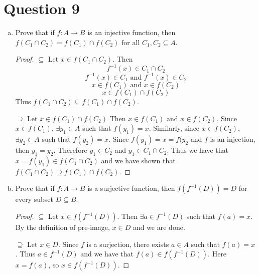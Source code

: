 \documentclass[11pt, oneside]{article}   	%
\begin{document}
\section*{Question 9}
\begin{enumerate}[(a)]
	\item Prove that if $f:A\to B$ is an injective function, then $f(C_1\cap C_2)=f(C_1)\cap f(C_2)$ for all $C_1, C_2\subseteq A$.
	\begin{proof}
		$\subseteq$ Let $x \in f(C_1\cap C_2)$. Then
		$$f^{-1}(x) \in C_1 \cap C_2$$
		$$f^{-1}(x) \in C_1 \text{ and } f^{-1}(x) \in C_2$$
		$$x \in f(C_1) \text{ and } x \in f(C_2)$$
		$$x \in f(C_1) \cap f(C_2)$$
		Thus $f(C_1\cap C_2) \subseteq f(C_1)\cap f(C_2)$.
		
		$\supseteq$ Let $x \in  f(C_1) \cap f(C_2)$ Then $x \in f(C_1)$ and $x \in f(C_2)$. Since $x \in f(C_1)$, $\exists y_1 \in A$ such that $f(y_1)=x$. Similarly, since $x \in f(C_2)$, $\exists y_2 \in A$ such that $f(y_2)=x$. Since $f(y_1) = x = f(y_2$ and $f$ is an injection, then $y_1=y_2$. Therefore $y_1 \in C_2$ and $y_1 \in C_1 \cap C_2$. Thus we have that $x=f(y_1) \in f(C_1 \cap C_2)$ and we have shown that $f(C_1\cap C_2) \supseteq f(C_1)\cap f(C_2)$.
		
	\end{proof}
	
	\item Prove that if $f:A\to B$ is a surjective function, then $f(f^{-1}(D))=D$ for every subset $D\subseteq B$.
	\begin{proof}
	$\subseteq$ Let $x \in f(f^{-1}(D))$. Then $\exists a \in f^{-1}(D)$ such that $f(a)=x$. By the definition of pre-image, $x \in D$ and we are done.
	
	$\supseteq$ Let $x \in D$. Since $f$ is a surjection, there exists $a \in A$ such that $f(a)=x$. Thus $a \in f^{-1}(D)$ and we have that $f(a) \in f(f^{-1}(D))$. Here $x=f(a)$, so $x \in f(f^{-1}(D))$.
	
	\end{proof}
\end{enumerate}
\end{document}
